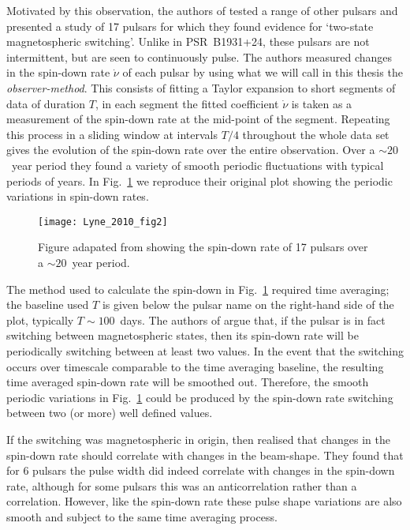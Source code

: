 Motivated by this observation, the authors of \citet{Lyne2010} tested a range
of other pulsars and presented a study of 17 pulsars for which they found
evidence for `two-state magnetospheric switching'. Unlike in PSR~B1931+24,
these pulsars are not intermittent, but are seen to continuously pulse. The
authors measured changes in the spin-down rate $\dot{\nu}$ of each pulsar by
using what we will call in this thesis the \emph{observer-method}. This
consists of fitting a Taylor expansion to short segments of data of duration
$T$, in each segment the fitted coefficient $\dot{\nu}$ is taken as a
measurement of the spin-down rate at the mid-point of the segment. Repeating
this process in a sliding window at intervals $T/4$ throughout the whole data set gives the
evolution of the spin-down rate over the entire observation.  Over a
$\sim20$~year period they found a variety of smooth periodic fluctuations with
typical periods of years. In Fig.~\ref{fig: lyne 2010 fig2} we reproduce their
original plot showing the periodic variations in spin-down rates.
\begin{figure}
    \centering
    \texttt{[image: Lyne\_2010\_fig2]}
    \caption{Figure adapated from \citet{Lyne2010} showing the spin-down rate
             of 17 pulsars over a $\sim20$~year period.}
    \label{fig: lyne 2010 fig2}
\end{figure}

The method used to calculate the spin-down in Fig.~\ref{fig: lyne 2010 fig2}
required time averaging; the baseline used $T$ is given below the pulsar name
on the right-hand side of the plot, typically $T\sim100$~days. The authors of
\citet{Lyne2010} argue that, if the pulsar is in fact switching between
magnetospheric states, then its spin-down rate will be periodically switching
between at least two values. In the event that the switching occurs over
timescale comparable to the time averaging baseline, the resulting time averaged
spin-down rate will be smoothed out. Therefore, the smooth periodic variations in
Fig.~\ref{fig: lyne 2010 fig2} could be produced by the spin-down rate
switching between two (or more) well defined values.

If the switching was magnetospheric in origin, then \citet{Lyne2010} realised
that changes in the spin-down rate should correlate with changes in the
beam-shape.  They found that for 6 pulsars the pulse width did indeed correlate
with changes in the spin-down rate, although for some pulsars this was an
anticorrelation rather than a correlation. However, like the spin-down rate
these pulse shape variations are also smooth and subject to the same time
averaging process. 


